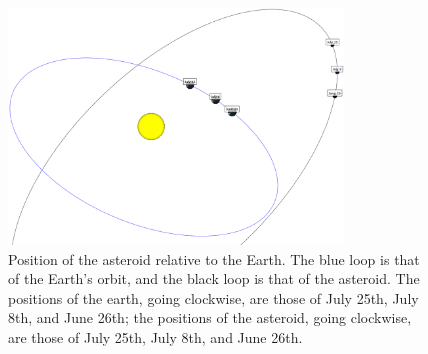 \documentclass[12pt,journal,compsoc]{IEEEtran}
\begin{document}
\begin{figure}[!t]
\centering
\includegraphics[width=3.5in]{Lick_Orbit2.png}
\caption{Position of the asteroid relative to the Earth.  The blue loop is that of the Earth's orbit, and the black loop is that of the asteroid.  The positions of the earth, going clockwise, are those of July 25th, July 8th, and June 26th; the positions of the asteroid, going clockwise, are those of July 25th, July 8th, and June 26th. }
\label{fig_sim}
\end{figure}

\begin{table}[!t]
\centering
{}
\caption{Measured orbital elements in comparison with JPL HORIZONS orbital elements \label{tab:HORIZONScomparison}}
\end{table}
\end{document}

